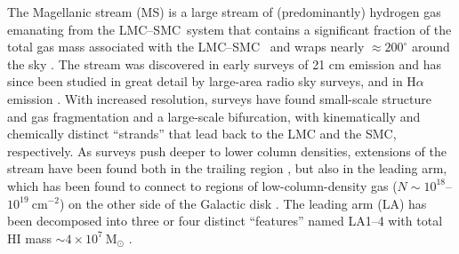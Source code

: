 \documentclass[twocolumn]{aastex62}
\newcommand{\msun}{\textrm{M}_\odot}
\newcommand{\feh}{\ensuremath{[\textrm{Fe} / \textrm{H}]}}
\newcommand{\hi}{H{\footnotesize I} }
\newcommand{\lmcsmc}{LMC--SMC}
\begin{document}

The Magellanic stream (MS) is a large stream of (predominantly) hydrogen gas emanating from the \lmcsmc\ system that contains a significant fraction of the total gas mass associated with the \lmcsmc\ \citep{Bruns:2005} and wraps nearly $\approx 200^\circ$ around the sky \citep{Mathewson:1974, Putman:1998, Bruns:2005, Nidever:2010}.
The stream was discovered in early surveys of 21 cm emission and has since been studied in great detail by large-area radio sky surveys, and in H$\alpha$ emission \citep{Weiner:1996, Barger:2017}.
With increased resolution, surveys have found small-scale structure and gas fragmentation \citep[e.g.,][]{Nidever:2008, For:2014} and a large-scale bifurcation, with %
kinematically \citep{Nidever:2008} and chemically \citep{Fox:2013} distinct ``strands'' that lead back to the LMC and the SMC, respectively.
As surveys push deeper to lower column densities, extensions of the stream have been found both in the trailing region \citep{Nidever:2010}, but also in the leading arm, which has been found to connect to regions of low-column-density gas ($N\sim 10^{18}$--$10^{19}~\textrm{cm}^{-2}$) on the other side of the Galactic disk \citep{Putman:1998, Nidever:2008}.
The leading arm (LA) has been decomposed into three or four distinct ``features'' named LA1--4 \citep{Bruns:2005, Nidever:2008, Venzmer:2012} with total HI mass $\sim 4 \times10^7~\msun$ \citep{Venzmer:2012}.
\end{document}
